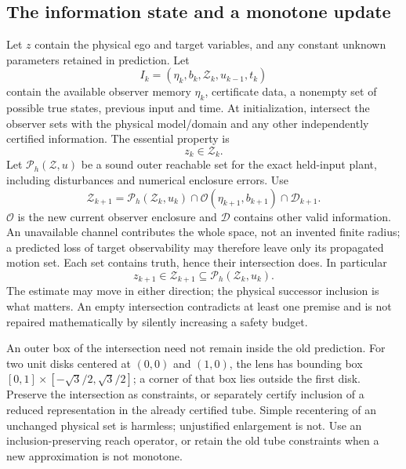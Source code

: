 \documentclass[10pt,letterpaper]{article}
\newcommand{\Z}{\mathcal Z}
\begin{document}
\subsection{The information state and a monotone update}
Let $z$ contain the physical ego and target variables, and any constant unknown
parameters retained in prediction. Let
\begin{equation}
I_k=(\eta_k,b_k,\Z_k,u_{k-1},t_k)
\end{equation}
contain the available observer memory $\eta_k$, certificate data, a nonempty
set of possible true states, previous input and time. At initialization,
intersect the observer sets with the physical model/domain and any other
independently certified information. The essential property is
\begin{equation}\label{eq:truth}
z_k\in\Z_k.
\end{equation}
Let $\mathcal P_h(\Z,u)$ be a sound outer reachable set for the exact held-input
plant, including disturbances and numerical enclosure errors. Use
\begin{equation}\label{eq:intersection}
\Z_{k+1}=\mathcal P_h(\Z_k,u_k)\cap
\mathcal O(\eta_{k+1},b_{k+1})\cap\mathcal D_{k+1}.
\end{equation}
$\mathcal O$ is the new current observer enclosure and $\mathcal D$ contains
other valid information. An unavailable channel contributes the whole space,
not an invented finite radius; a predicted loss of target observability may
therefore leave only its propagated motion set. Each set contains truth,
hence their intersection does.
In particular
\begin{equation}\label{eq:nesting}
z_{k+1}\in\Z_{k+1}\subseteq\mathcal P_h(\Z_k,u_k).
\end{equation}
The estimate may move in either direction; the physical successor inclusion is
what matters. An empty intersection contradicts at least one premise and is
not repaired mathematically by silently increasing a safety budget.

An outer box of the intersection need not remain inside the old prediction.
For two unit disks centered at $(0,0)$ and $(1,0)$, the lens has bounding box
$[0,1]\times[-\sqrt3/2,\sqrt3/2]$; a corner of that box lies outside the first
disk. Preserve the intersection as constraints, or separately certify inclusion
of a reduced representation in the already certified tube. Simple recentering
of an unchanged physical set is harmless; unjustified enlargement is not.
Use an inclusion-preserving reach operator, or retain the old tube constraints
when a new approximation is not monotone.
\end{document}
